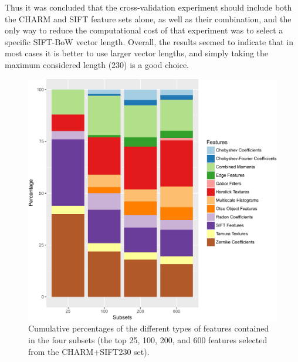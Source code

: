 Thus it was concluded that the cross-validation experiment should include both the CHARM and SIFT feature sets alone, as well as their combination, and the only way to reduce the computational cost of that experiment was to select a specific SIFT-BoW vector length. Overall, the results seemed to indicate that in most cases it is better to use larger vector lengths, and simply taking the maximum considered length (230) is a good choice.
\begin{figure}[h!]
	\centering
	\includegraphics[width=\columnwidth]{fig07}
	\caption{Cumulative percentages of the different types of features contained in the four subsets (the top 25, 100, 200, and 600 features selected from the CHARM+SIFT230 set).}
	\label{ch5_fig7}
\end{figure}
